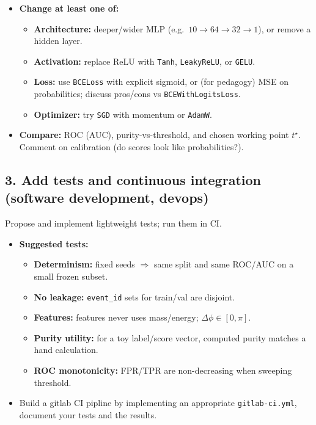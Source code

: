 \documentclass[11pt]{article}
\begin{document}
\begin{itemize}
  \item \textbf{Change at least one of:}
    \begin{itemize}
      \item \textbf{Architecture:} deeper/wider MLP (e.g.\ $10\!\to\!64\!\to\!32\!\to\!1$), or remove a hidden layer.
      \item \textbf{Activation:} replace ReLU with \texttt{Tanh}, \texttt{LeakyReLU}, or \texttt{GELU}.
      \item \textbf{Loss:} use \texttt{BCELoss} with explicit sigmoid, or (for pedagogy) MSE on probabilities; discuss pros/cons vs \texttt{BCEWithLogitsLoss}.
      \item \textbf{Optimizer:} try \texttt{SGD} with momentum or \texttt{AdamW}.
    \end{itemize}
  \item \textbf{Compare:} ROC (AUC), purity-vs-threshold, and chosen working point \(t^\star\). Comment on calibration (do scores look like probabilities?).
\end{itemize}

\subsection*{3. Add tests and continuous integration (software development, devops)}
Propose and implement lightweight tests; run them in CI.

\begin{itemize}
  \item \textbf{Suggested tests:}
    \begin{itemize}
      \item \textbf{Determinism:} fixed seeds $\Rightarrow$ same split and same ROC/AUC on a small frozen subset.
      \item \textbf{No leakage:} \texttt{event\_id} sets for train/val are disjoint.
      \item \textbf{Features:} features never uses mass/energy; $\Delta\phi\in[0,\pi]$.
      \item \textbf{Purity utility:} for a toy label/score vector, computed purity matches a hand calculation.
      \item \textbf{ROC monotonicity:} FPR/TPR are non-decreasing when sweeping threshold.
    \end{itemize}
  \item Build a gitlab CI pipline by implementing an appropriate \texttt{gitlab-ci.yml}, document your tests and the results.
\end{itemize}
\end{document}

